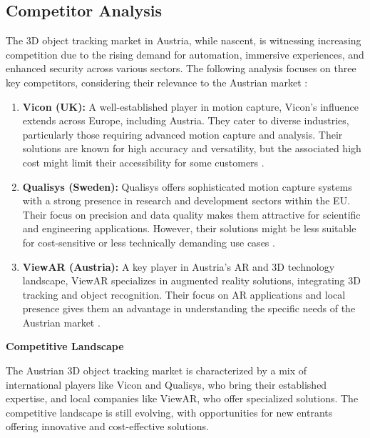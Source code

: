 
\subsection{Competitor Analysis}

The 3D object tracking market in Austria, while nascent, is witnessing increasing competition due to the rising demand for automation, immersive experiences, and enhanced security across various sectors. The following analysis focuses on three key competitors, considering their relevance to the Austrian market \cite{businessresearchinsights_3d_motion_capture_market}:

\begin{enumerate}
	\item \textbf{Vicon (UK):} A well-established player in motion capture, Vicon's influence extends across Europe, including Austria. They cater to diverse industries, particularly those requiring advanced motion capture and analysis. Their solutions are known for high accuracy and versatility, but the associated high cost might limit their accessibility for some customers \cite{vicon_motion_systems_ltd}.
	
	\item \textbf{Qualisys (Sweden):} Qualisys offers sophisticated motion capture systems with a strong presence in research and development sectors within the EU. Their focus on precision and data quality makes them attractive for scientific and engineering applications. However, their solutions might be less suitable for cost-sensitive or less technically demanding use cases \cite{qualisys_motion_capture_systems}.
	
	\item \textbf{ViewAR (Austria):} A key player in Austria's AR and 3D technology landscape, ViewAR specializes in augmented reality solutions, integrating 3D tracking and object recognition. Their focus on AR applications and local presence gives them an advantage in understanding the specific needs of the Austrian market \cite{viewar_augmented_reality_solutions}. 
\end{enumerate}

\textbf{Competitive Landscape}

The Austrian 3D object tracking market is characterized by a mix of international players like Vicon and Qualisys, who bring their established expertise, and local companies like ViewAR, who offer specialized solutions. The competitive landscape is still evolving, with opportunities for new entrants offering innovative and cost-effective solutions.


